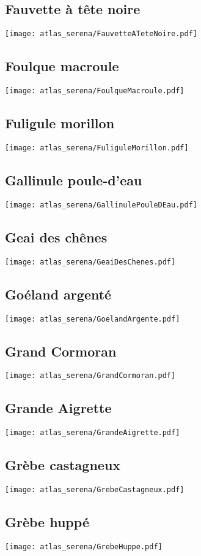 \subsection{Fauvette à tête noire}
\texttt{[image: atlas\_serena/FauvetteATeteNoire.pdf]}
\subsection{Foulque macroule}
\texttt{[image: atlas\_serena/FoulqueMacroule.pdf]}
\subsection{Fuligule morillon}
\texttt{[image: atlas\_serena/FuliguleMorillon.pdf]}
\subsection{Gallinule poule-d’eau}
\texttt{[image: atlas\_serena/GallinulePouleDEau.pdf]}
\subsection{Geai des chênes}
\texttt{[image: atlas\_serena/GeaiDesChenes.pdf]}
\subsection{Goéland argenté}
\texttt{[image: atlas\_serena/GoelandArgente.pdf]}
\subsection{Grand Cormoran}
\texttt{[image: atlas\_serena/GrandCormoran.pdf]}
\subsection{Grande Aigrette}
\texttt{[image: atlas\_serena/GrandeAigrette.pdf]}
\subsection{Grèbe castagneux}
\texttt{[image: atlas\_serena/GrebeCastagneux.pdf]}
\subsection{Grèbe huppé}
\texttt{[image: atlas\_serena/GrebeHuppe.pdf]}
